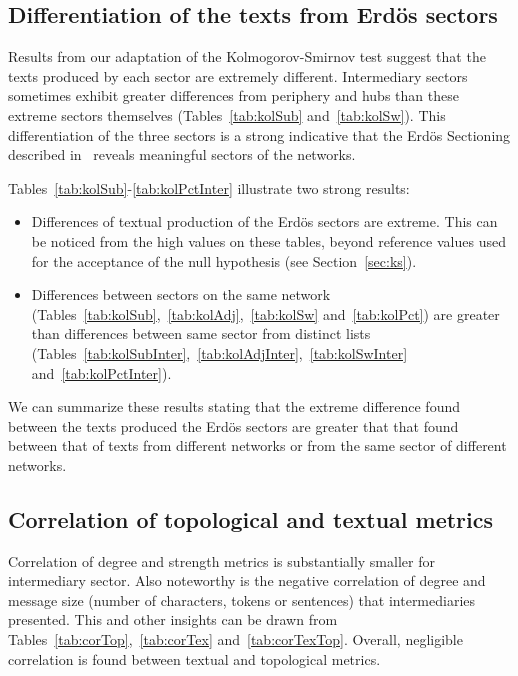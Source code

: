 \documentclass[%
 aip,
 jmp,%
 amsmath,amssymb,
 reprint,%
]{revtex4-1}
\begin{document}
\subsection{Differentiation of the texts from Erd\"os sectors}\label{subsec:di}







Results from our adaptation of the Kolmogorov-Smirnov test
suggest that the texts produced by each sector are extremely different.
Intermediary sectors sometimes exhibit greater differences 
from periphery and hubs than these extreme sectors themselves 
(Tables~\ref{tab:kolSub} and~\ref{tab:kolSw}).
This differentiation of the three sectors is a
strong indicative that the Erd\"os Sectioning
described in~\cite{evoSN} reveals meaningful
sectors of the networks.

Tables~\ref{tab:kolSub}-\ref{tab:kolPctInter}
illustrate two strong results:
\begin{itemize}
    \item Differences of textual production of the Erd\"os sectors are extreme.
	    This can be noticed from the high values on these tables,
	    beyond reference values used for the acceptance of the 
	    null hypothesis (see Section~\ref{sec:ks}).
    \item Differences between sectors on the same network 
	    (Tables~\ref{tab:kolSub},~\ref{tab:kolAdj},~\ref{tab:kolSw} and~\ref{tab:kolPct}) are greater than differences between same sector from distinct lists (Tables~\ref{tab:kolSubInter},~\ref{tab:kolAdjInter},~\ref{tab:kolSwInter} and~\ref{tab:kolPctInter}).
\end{itemize}

We can summarize these results stating that the extreme difference
found between the texts produced the Erd\"os sectors
are greater that that found between that of texts from different
networks or from the same sector of different networks.

\subsection{Correlation of topological and textual metrics}\label{subsec:cor}
Correlation of degree 
and strength metrics is
substantially smaller for intermediary sector.
Also noteworthy is the negative correlation of degree and message size (number of characters, tokens or sentences) that intermediaries presented.
This and other insights can be drawn from Tables~\ref{tab:corTop},~\ref{tab:corTex} and~\ref{tab:corTexTop}.
Overall, negligible correlation is found between textual and topological metrics.
\end{document}
